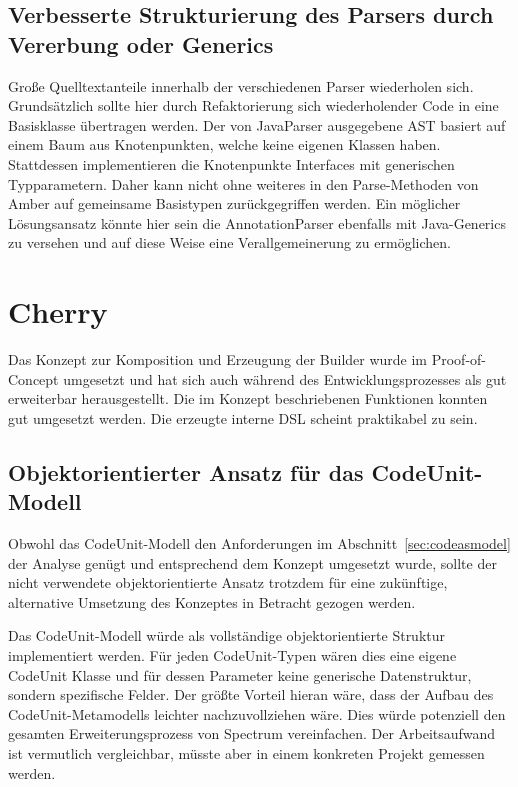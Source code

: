 \documentclass[12pt,oneside,a4paper,parskip]{scrbook}
\begin{document}
\subsection{Verbesserte Strukturierung des Parsers durch Vererbung oder Generics}

Große Quelltextanteile innerhalb der verschiedenen Parser wiederholen sich. Grundsätzlich sollte hier durch Refaktorierung sich wiederholender Code in eine Basisklasse übertragen werden. Der von JavaParser ausgegebene AST basiert auf einem Baum aus Knotenpunkten, welche keine eigenen Klassen haben. Stattdessen implementieren die Knotenpunkte Interfaces mit generischen Typparametern. Daher kann nicht ohne weiteres in den Parse-Methoden von Amber auf gemeinsame Basistypen zurückgegriffen werden. Ein möglicher Lösungsansatz könnte hier sein die AnnotationParser ebenfalls mit Java-Generics zu versehen und auf diese Weise eine Verallgemeinerung zu ermöglichen.

\section{Cherry}

Das Konzept zur Komposition und Erzeugung der Builder wurde im Proof-of-Concept umgesetzt und hat sich auch während des Entwicklungsprozesses als gut erweiterbar herausgestellt. Die im Konzept beschriebenen Funktionen konnten gut umgesetzt werden. Die erzeugte interne DSL scheint praktikabel zu sein. 

\subsection{Objektorientierter Ansatz für das CodeUnit-Modell}

Obwohl das CodeUnit-Modell den Anforderungen im Abschnitt~\ref{sec:codeasmodel} der Analyse genügt und entsprechend dem Konzept umgesetzt wurde, sollte der nicht verwendete objektorientierte Ansatz trotzdem für eine zukünftige, alternative Umsetzung des Konzeptes in Betracht gezogen werden.

Das CodeUnit-Modell würde als vollständige objektorientierte Struktur implementiert werden. Für jeden CodeUnit-Typen wären dies eine eigene CodeUnit Klasse und für dessen Parameter keine generische Datenstruktur, sondern spezifische Felder. Der größte Vorteil hieran wäre, dass der Aufbau des CodeUnit-Metamodells leichter nachzuvollziehen wäre. Dies würde potenziell den gesamten Erweiterungsprozess von Spectrum vereinfachen. Der Arbeitsaufwand ist vermutlich vergleichbar, müsste aber in einem konkreten Projekt gemessen werden.
\end{document}
